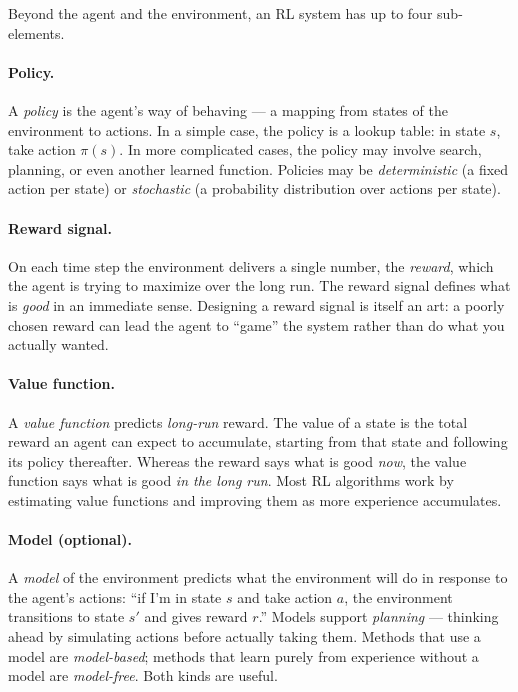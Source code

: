 \documentclass[../../book.tex]{subfiles}
\begin{document}
Beyond the agent and the environment, an RL system has up to four sub-elements.

\paragraph{Policy.}    A \emph{policy} is the agent's way of behaving --- a mapping from states of the environment to actions.  In a simple case, the policy is a lookup table: in state $s$, take action $\pi(s)$.  In more complicated cases, the policy may involve search, planning, or even another learned function.  Policies may be \emph{deterministic} (a fixed action per state) or \emph{stochastic} (a probability distribution over actions per state).

\paragraph{Reward signal.}   On each time step the environment delivers a single number, the \emph{reward}, which the agent is trying to maximize over the long run.  The reward signal defines what is \emph{good} in an immediate sense.  Designing a reward signal is itself an art: a poorly chosen reward can lead the agent to ``game'' the system rather than do what you actually wanted.

\paragraph{Value function.}   A \emph{value function} predicts \emph{long-run} reward.  The value of a state is the total reward an agent can expect to accumulate, starting from that state and following its policy thereafter.  Whereas the reward says what is good \emph{now}, the value function says what is good \emph{in the long run}.  Most RL algorithms work by estimating value functions and improving them as more experience accumulates.

\paragraph{Model (optional).}    A \emph{model} of the environment predicts what the environment will do in response to the agent's actions: ``if I'm in state $s$ and take action $a$, the environment transitions to state $s'$ and gives reward $r$.''  Models support \emph{planning} --- thinking ahead by simulating actions before actually taking them.  Methods that use a model are \emph{model-based}; methods that learn purely from experience without a model are \emph{model-free}.  Both kinds are useful.
\end{document}
